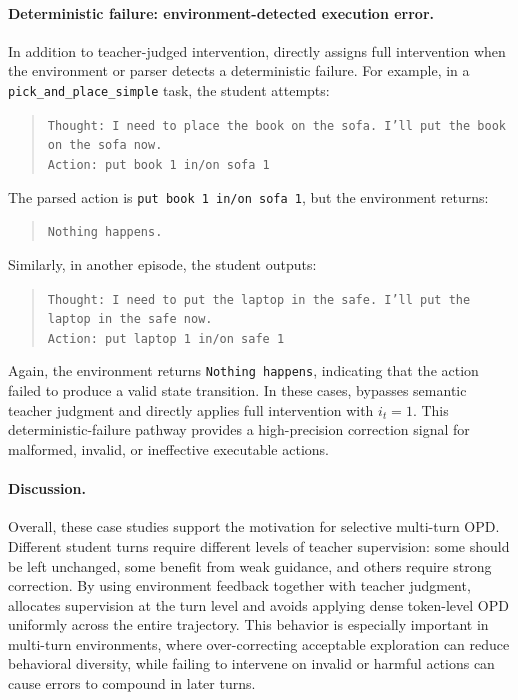 \paragraph{Deterministic failure: environment-detected execution error.}
In addition to teacher-judged intervention, \ours{} directly assigns full intervention when the environment or parser detects a deterministic failure.
%
For example, in a \texttt{pick\_and\_place\_simple} task, the student attempts:
%
\begin{quote}
\small
\texttt{Thought: I need to place the book on the sofa. I'll put the book on the sofa now.}\\
\texttt{Action: put book 1 in/on sofa 1}
\end{quote}
%
The parsed action is \texttt{put book 1 in/on sofa 1}, but the environment returns:
%
\begin{quote}
\small
\texttt{Nothing happens.}
\end{quote}
%
Similarly, in another episode, the student outputs:
%
\begin{quote}
\small
\texttt{Thought: I need to put the laptop in the safe. I'll put the laptop in the safe now.}\\
\texttt{Action: put laptop 1 in/on safe 1}
\end{quote}
%
Again, the environment returns \texttt{Nothing happens}, indicating that the action failed to produce a valid state transition.
%
In these cases, \ours{} bypasses semantic teacher judgment and directly applies full intervention with $i_t=1$.
%
This deterministic-failure pathway provides a high-precision correction signal for malformed, invalid, or ineffective executable actions.

\paragraph{Discussion.}
Overall, these case studies support the motivation for selective multi-turn OPD.
%
Different student turns require different levels of teacher supervision: some should be left unchanged, some benefit from weak guidance, and others require strong correction.
%
By using environment feedback together with teacher judgment, \ours{} allocates supervision at the turn level and avoids applying dense token-level OPD uniformly across the entire trajectory.
%
This behavior is especially important in multi-turn environments, where over-correcting acceptable exploration can reduce behavioral diversity, while failing to intervene on invalid or harmful actions can cause errors to compound in later turns.









